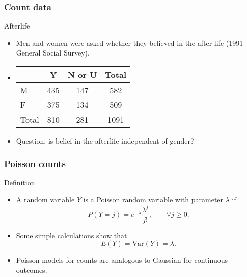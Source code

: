 \documentclass[handout]{beamer}
\begin{document}
   \begin{frame} \frametitle{Count data}

   \begin{block}
     {Afterlife}
     \begin{itemize}
     \item   Men and women were asked whether they believed in the
   after life (1991 General Social Survey).

   \item
     \begin{tabular}{l|c|c|c}
       & Y & N or U & Total \\ \hline
   M & 435 & 147 & 582 \\
   F & 375 & 134 & 509 \\ \hline
   Total & 810 & 281 & 1091
     \end{tabular}

   \item Question: is belief in the afterlife independent of gender?

     \end{itemize}
   \end{block}
   \end{frame}


   \begin{frame} \frametitle{Poisson counts}

   \begin{block}
   {Definition}
   \begin{itemize}
   \item A random variable $Y$ is a Poisson random variable
   with parameter $\lambda$ if
   $$
   P(Y=j) = e^{-\lambda} \frac{\lambda^j}{j!}, \qquad \forall j \geq 0.
   $$
   \item Some simple calculations show that
   $$
   E(Y)=\text{Var}(Y)=\lambda.
   $$
   \item Poisson models for counts are analogous to Gaussian for continuous
   outcomes.
   \end{itemize}
   \end{block}
   \end{frame}

\end{document}
